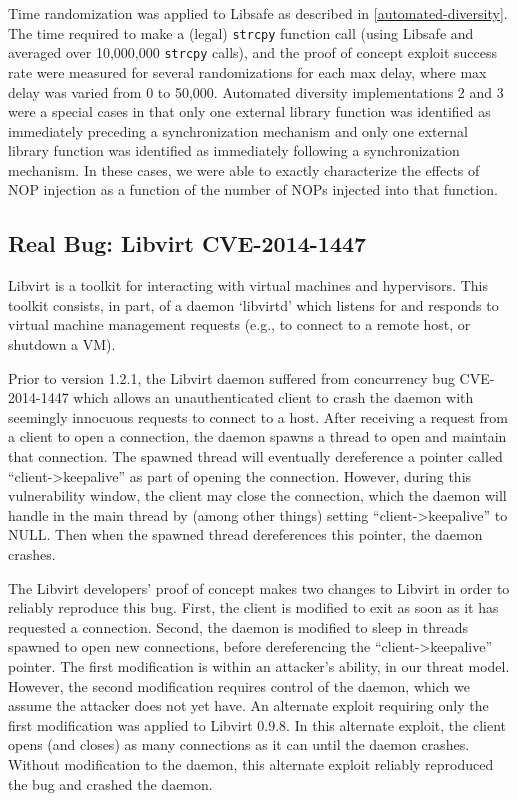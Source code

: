 Time randomization was applied to Libsafe as described in \autoref{automated-diversity}.
The time required to make a (legal) \texttt{strcpy} function call (using Libsafe and averaged over 10,000,000 \texttt{strcpy} calls), and the proof of concept exploit success rate were measured for several randomizations for each max delay, where max delay was varied from 0 to 50,000.
Automated diversity implementations 2 and 3 were a special cases in that only one external library function was identified as immediately preceding a synchronization mechanism and only one external library function was identified as immediately following a synchronization mechanism.
In these cases, we were able to exactly characterize the effects of NOP injection as a function of the number of NOPs injected into that function.
\subsection{Real Bug: Libvirt CVE-2014-1447}
Libvirt \cite{libvirt} is a toolkit for interacting with virtual machines and hypervisors.
This toolkit consists, in part, of a daemon `libvirtd' which listens for and
responds to virtual machine management requests (e.g., to connect to a remote host, or shutdown a VM).

Prior to version 1.2.1, the Libvirt daemon suffered from concurrency bug CVE-2014-1447 which allows an unauthenticated client to crash the daemon with seemingly innocuous requests to connect to a host.
After receiving a request from a client to open a connection, the daemon spawns a thread to open and maintain that connection.
The spawned thread will eventually dereference a pointer called
``client->keepalive'' as part of opening the connection.
However, during this vulnerability window, the client may close the
connection, which the daemon will handle in the main thread by (among other
things) setting ``client->keepalive'' to NULL.
Then when the spawned thread dereferences this pointer, the daemon crashes. \cite{RHELbug1047577}

The Libvirt developers' proof of concept makes two changes to Libvirt in order to reliably reproduce this bug.
First, the client is modified to exit as soon as it has requested a connection.
Second, the daemon is modified to sleep in threads spawned to open new
connections, before dereferencing the ``client->keepalive'' pointer.
The first modification is within an attacker's ability, in our threat model.
However, the second modification requires control of the daemon, which we assume the attacker does not yet have.
An alternate exploit requiring only the first modification was applied to Libvirt 0.9.8.
In this alternate exploit, the client opens (and closes) as many connections as it can until the daemon crashes.
Without modification to the daemon, this alternate exploit reliably reproduced the bug and crashed the daemon.

